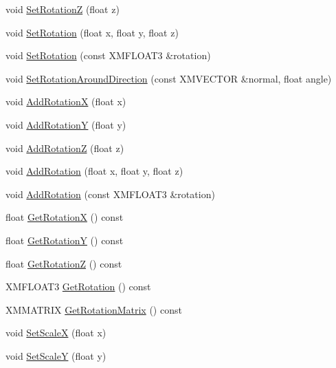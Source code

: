 \begin{DoxyCompactItemize}
\item 
void \hyperlink{structmage_1_1_transform_ac587047697f24d2279e7b4f5ab333f44}{Set\+RotationZ} (float z)
\item 
void \hyperlink{structmage_1_1_transform_a8e8fffa4ae9bc969196151daf4502421}{Set\+Rotation} (float x, float y, float z)
\item 
void \hyperlink{structmage_1_1_transform_a6b15a1591a10fe2984b7e8b0b8c92bd5}{Set\+Rotation} (const X\+M\+F\+L\+O\+A\+T3 \&rotation)
\item 
void \hyperlink{structmage_1_1_transform_afad1810a6efc642aeb3c54488501c704}{Set\+Rotation\+Around\+Direction} (const X\+M\+V\+E\+C\+T\+OR \&normal, float angle)
\item 
void \hyperlink{structmage_1_1_transform_ae2a3a4a33ec637b9c39e97519bab5a11}{Add\+RotationX} (float x)
\item 
void \hyperlink{structmage_1_1_transform_afc958d2361a5606962b51646825287e2}{Add\+RotationY} (float y)
\item 
void \hyperlink{structmage_1_1_transform_ae70e192a7d98366b629c3d75a7d2d3bd}{Add\+RotationZ} (float z)
\item 
void \hyperlink{structmage_1_1_transform_a71126843acf10e00d0381b5463978aba}{Add\+Rotation} (float x, float y, float z)
\item 
void \hyperlink{structmage_1_1_transform_a10825624e694790a60e0ea507207132e}{Add\+Rotation} (const X\+M\+F\+L\+O\+A\+T3 \&rotation)
\item 
float \hyperlink{structmage_1_1_transform_aaaf300a4a24b976c271ba17c8a41beaf}{Get\+RotationX} () const
\item 
float \hyperlink{structmage_1_1_transform_a93ccd53bd0a4e71ab7f42447d482ab86}{Get\+RotationY} () const
\item 
float \hyperlink{structmage_1_1_transform_ae1dd099e12e6dedadbc31d679343b39a}{Get\+RotationZ} () const
\item 
X\+M\+F\+L\+O\+A\+T3 \hyperlink{structmage_1_1_transform_a30a0464b1bd2fb37d6b5cc2155323a14}{Get\+Rotation} () const
\item 
X\+M\+M\+A\+T\+R\+IX \hyperlink{structmage_1_1_transform_a27ca7a5c40ea16c9a885a410b2a1f416}{Get\+Rotation\+Matrix} () const
\item 
void \hyperlink{structmage_1_1_transform_a4d1fbb0b609e40b6b13e0e282259d223}{Set\+ScaleX} (float x)
\item 
void \hyperlink{structmage_1_1_transform_a77251bb29fbd26817c0b8c8aabb96ce4}{Set\+ScaleY} (float y)
\item 

\end{DoxyCompactItemize}

